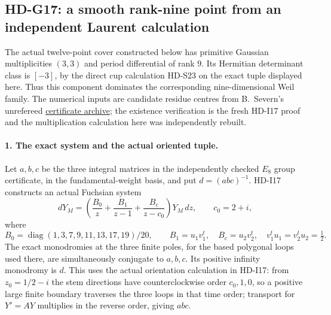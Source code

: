 \subsection{HD-G17: a smooth rank-nine point from an independent Laurent calculation}
\label{sec:HD-G17}

The actual twelve-point cover constructed below has primitive
Gaussian multiplicities $(3,3)$ and period differential of rank $9$.
Its Hermitian determinant class is $[-3]$, by the direct cup
calculation HD-S23 on the exact tuple displayed here.  Thus this component
dominates the corresponding nine-dimensional Weil family.
The numerical inputs are candidate residue centres from
B.~Severn's unrefereed
\href{https://doi.org/10.5281/zenodo.23549514}{certificate archive};
the existence verification is the fresh HD-I17 proof and the
multiplication calculation here was independently rebuilt.

\paragraph{1. The exact system and the actual oriented tuple.}
Let $a,b,c$ be the three integral matrices in the independently checked
$E_8$ group certificate, in the fundamental-weight basis, and put
$d=(abc)^{-1}$.  HD-I17 constructs an actual Fuchsian system
\[
 dY_M=\left(\frac{B_0}{z}+\frac{B_1}{z-1}
                  +\frac{B_c}{z-c_0}\right)Y_M\,dz,\qquad c_0=2+i,
\]
where
\[
 B_0=\operatorname{diag}(1,3,7,9,11,13,17,19)/20,\qquad
 B_1=u_1v_1^t,\quad B_c=u_2v_2^t,
 \quad v_1^tu_1=v_2^tu_2=\tfrac12.
\]
The exact monodromies at the three finite poles, for the based
polygonal loops used there, are simultaneously conjugate to
$a,b,c$.  Its positive infinity monodromy is $d$.
This uses the actual orientation calculation in HD-I17: from
$z_0=1/2-i$ the stem directions have counterclockwise order
$c_0,1,0$, so a positive large finite boundary traverses the three
loops in that time order; transport for $Y'=AY$ multiplies in
the reverse order, giving $abc$.

